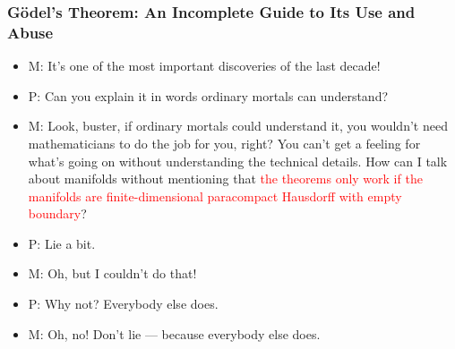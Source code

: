 \documentclass[UTF8,aspectratio=43,11pt,colorlinks,compress,openany]{beamer}%
\begin{document}
\begin{frame}\frametitle{\small G\"odel's Theorem: An Incomplete Guide to Its Use and Abuse}
\begin{itemize}
	\item M: It's one of the most important discoveries of the last decade!
	\item P: Can you explain it in words ordinary mortals can understand?
	\item M: Look, buster, if ordinary mortals could understand it, you wouldn't need mathematicians to do the job for you, right? You can't get a feeling for what's going on without understanding the technical details. How can I talk about manifolds without mentioning that \textcolor{red}{the theorems only work if the manifolds are finite-dimensional paracompact Hausdorff with empty boundary}?
	\item P: Lie a bit.
	\item M: Oh, but I couldn't do that!
	\item P: Why not? Everybody else does.
	\item M: Oh, no! Don't lie --- because everybody else does.
\end{itemize}
\end{frame}
\end{document}
